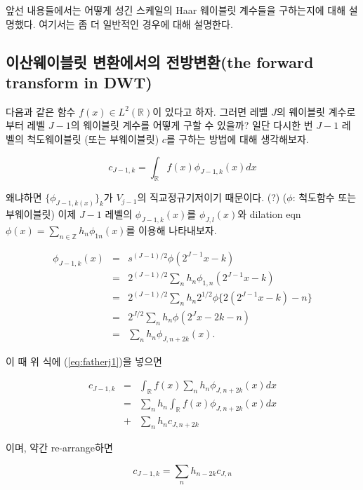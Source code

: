 \documentclass[b5paper,]{scrbook}
\theoremstyle{plain}
\theoremstyle{definition}
\numberwithin{equation}{section}
\begin{document}
앞선 내용들에서는 어떻게 성긴 스케일의 Haar 웨이블릿 계수들을 구하는지에
대해 설명했다. 여기서는 좀 더 일반적인 경우에 대해 설명한다.

\subsection{이산웨이블릿 변환에서의 전방변환(the forward transform in
DWT)}\label{--the-forward-transform-in-dwt}

다음과 같은 함수 \(f(x)\in L^{2}(\mathbb{R})\)이 있다고 하자. 그러면
레벨 \(J\)의 웨이블릿 계수로부터 레벨 \(J-1\)의 웨이블릿 계수를 어떻게
구할 수 있을까? 일단 다시한 번 \(J-1\) 레벨의 척도웨이블릿 (또는
부웨이블릿) \(c\)를 구하는 방법에 대해 생각해보자.

\begin{equation}\label{eq:fatherj1}
c_{J-1,k}=\int_{\mathbb{R}}f(x)\phi_{J-1,k}(x)dx
\end{equation}

왜냐하면 \(\{ \phi_{J-1,k(x)}\}_{k}\)가 \(V_{j-1}\)의 직교정규기저이기
때문이다. (?) (\(\phi\): 척도함수 또는 부웨이블릿) 이제 \(J-1\) 레벨의
\(\phi_{J-1,k}(x)\)를 \(\phi_{J,l}(x)\)와 dilation eqn
\(\phi(x)=\sum_{n\in\mathbb{Z}}h_{n}\phi_{1n}(x)\)를 이용해 나타내보자.

\begin{eqnarray}\label{eq:fatherj2}
\phi_{J-1,k}(x)&=&s^{(J-1)/2}\phi(2^{J-1}x-k)\nonumber\\
&=&2^{(J-1)/2}\sum_{n}h_{n}\phi_{1,n}(2^{J-1}x-k)\nonumber\\
&=&2^{(J-1)/2}\sum_{n}h_{n}2^{1/2}\phi\{2(2^{J-1}x-k)-n\}\nonumber\\
&=&2^{J/2}\sum_{n}h_{n}\phi(2^{J}x-2k-n)\nonumber\\ 
&=&\sum_{n}h_{n}\phi_{J,n+2k}(x).
\end{eqnarray}

이 때 위 식에 (\eqref{eq:fatherj1})을 넣으면

\begin{eqnarray}\label{eq:fatherj3}
c_{J-1,k}&=&\int_{\mathbb{R}}f(x)\sum_{n}h_{n}\phi_{J,n+2k}(x)dx\nonumber\\
&=&\sum_{n}h_{n}\int_{\mathbb{R}}f(x)\phi_{J,n+2k}(x)dx\nonumber\\
&+&\sum_{n}h_{n}c_{J,n+2k}
\end{eqnarray}

이며, 약간 re-arrange하면

\begin{equation}\label{eq:fatherj4}
c_{J-1,k}=\sum_{n}h_{n-2k}c_{J,n}
\end{equation}
\end{document}
